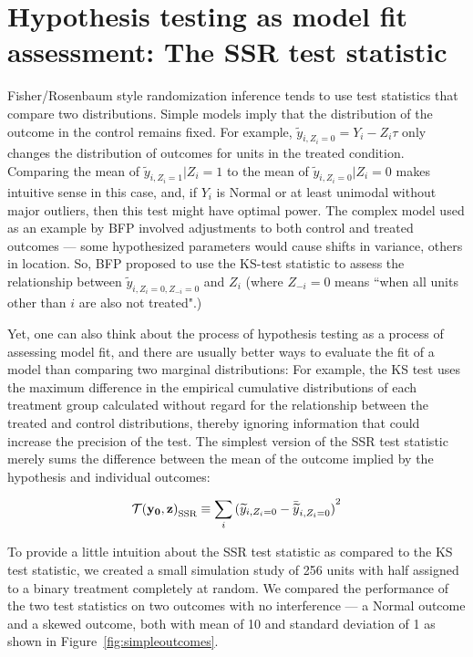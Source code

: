 \section{Hypothesis testing as model fit assessment: The SSR test statistic}

Fisher/Rosenbaum style randomization inference tends to use test statistics that
compare two distributions. Simple models imply that the distribution of the
outcome in the control remains fixed. For example, $\widetilde
y_{i,Z_i=0}=Y_i-Z_i \tau$ only changes the distribution of outcomes for units
in the treated condition. Comparing the mean of $\widetilde y_{i,Z_i=1}|Z_i=1$
to the mean of $\widetilde y_{i,Z_i=0}|Z_i=0$ makes intuitive sense in this
case, and, if $Y_i$ is Normal or at least unimodal without major outliers,
then this test might have optimal power. The complex model used as an example
by BFP involved adjustments to both control and treated outcomes --- some
hypothesized parameters would cause shifts in variance, others in location.
So, BFP proposed to use the KS-test statistic to assess the relationship
between $\widetilde y_{i,Z_i=0,Z_{-i}=0}$ and $Z_i$ (where $Z_{-i}=0$ means
``when all units other than $i$ are also not treated".)

Yet, one can also think about the process of hypothesis testing as a process
of assessing model fit, and there are usually better ways to evaluate the fit
of a model than comparing two marginal distributions: For example, the KS test
  uses the maximum difference in the empirical cumulative distributions of
  each treatment group calculated without regard for the relationship between
the treated and control distributions, thereby ignoring information that could
increase the precision of the test. The simplest version of the SSR test
statistic merely sums the difference between the mean of the outcome implied
by the hypothesis and individual outcomes:

\begin{equation}
 {\mathcal{T}(\mathbf{y}_{\mathbf{0}},\mathbf{z})}_{\text{SSR}} \equiv \sum_{i} {( \widetilde y_{i,Z_i=0} - \bar{\widetilde{y}}_{i,Z_i=0} )}^2 \label{eq:ssr1}
\end{equation}

To provide a little intuition about the SSR test statistic as compared to the
KS test statistic, we created a small simulation study of 256 units with half
assigned to a binary treatment completely at random. We compared the
performance of the two test statistics on two outcomes with no interference
--- a Normal outcome and a skewed outcome, both with mean of 10 and standard
deviation of 1 as shown in Figure~\ref{fig:simpleoutcomes}.

